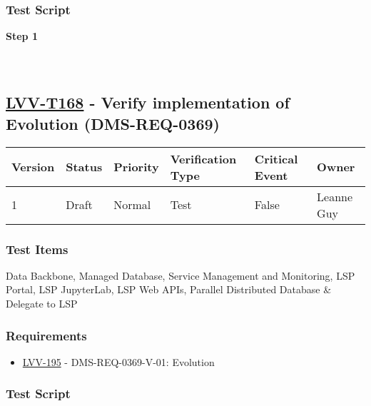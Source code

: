 \hypertarget{test-script-144}{%
\subsubsection{Test Script}\label{test-script-144}}

\textbf{Step 1}\\
~\\
~\\

\hypertarget{lvv-t168---verify-implementation-of-evolution-dms-req-0369}{%
\subsection{\texorpdfstring{\href{https://jira.lsstcorp.org/secure/Tests.jspa\#/testCase/LVV-T168}{LVV-T168}
- Verify implementation of Evolution
(DMS-REQ-0369)}{LVV-T168 - Verify implementation of Evolution (DMS-REQ-0369)}}\label{lvv-t168---verify-implementation-of-evolution-dms-req-0369}}

\begin{longtable}[]{@{}llllll@{}}
\toprule
Version & Status & Priority & Verification Type & Critical Event &
Owner\tabularnewline
\midrule
\endhead
1 & Draft & Normal & Test & False & Leanne Guy\tabularnewline
\bottomrule
\end{longtable}

\hypertarget{test-items-144}{%
\subsubsection{Test Items}\label{test-items-144}}

Data Backbone, Managed Database, Service Management and Monitoring, LSP
Portal, LSP JupyterLab, LSP Web APIs, Parallel Distributed Database \&
Delegate to LSP

\hypertarget{requirements-145}{%
\subsubsection{Requirements}\label{requirements-145}}

\begin{itemize}
\tightlist
\item
  \href{https://jira.lsstcorp.org/browse/LVV-195}{LVV-195} -
  DMS-REQ-0369-V-01: Evolution
\end{itemize}

\hypertarget{test-script-145}{%
\subsubsection{Test Script}\label{test-script-145}}

